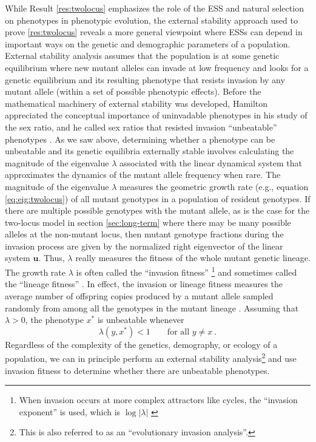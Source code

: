 \documentclass[11pt]{article}
\newcommand{\ess}[1]{#1^*}
\renewcommand{\vec}[1]{\symbf{#1}}
\newcommand{\eig}{\lambda}
\begin{document}
While Result \ref{res:twolocus} emphasizes the role of the ESS and natural selection on phenotypes in phenotypic evolution, the external stability approach used to prove \ref{res:twolocus} reveals a more general viewpoint where ESSs can depend in important ways on the genetic and demographic parameters of a population. External stability analysis assumes that the population is at some genetic equilibrium where new mutant alleles can invade at low frequency and looks for a genetic equilibrium and its resulting phenotype that resists invasion by any mutant allele (within a set of possible phenotypic effects). Before the mathematical machinery of external stability was developed, Hamilton appreciated the conceptual importance of uninvadable phenotypes in his study of the sex ratio, and he called sex ratios that resisted invasion ``unbeatable'' phenotypes \cite{Hamilton:1967}. As we saw above, determining whether a phenotype can be unbeatable and its genetic equilibria externally stable involves calculating the magnitude of the eigenvalue $\eig$ associated with the linear dynamical system that approximates the dynamics of the mutant allele frequency when rare. The magnitude of the eigenvalue $\eig$ measures the geometric growth rate (e.g., equation \eqref{eq:eig:twolocus}) of all mutant genotypes in a population of resident genotypes. If there are multiple possible genotypes with the mutant allele, as is the case for the two-locus model in section \ref{sec:long-term} where there may be many possible alleles at the non-mutant locus, then mutant genotype fractions during the invasion process are given by the normalized right eigenvector of the linear system $\vec{u}$. Thus, $\eig$ really measures the fitness of the whole mutant genetic lineage. The growth rate $\eig$ is often called the ``invasion fitness'' \cite{Metz:Nisbet:1992,Heino:Metz:1998}\footnote{When invasion occurs at more complex attractors like cycles, the ``invasion exponent'' is used, which is $\log |\eig|$ \cite{Rand:Wilson:1994}} and sometimes called the ``lineage fitness'' \cite{Lehmann:Alger:2015,Akcay:VanCleve:2016,Lehmann:Mullon:2016,Lehmann:Rousset:2020}. In effect, the invasion or lineage fitness measures the average number of offspring copies produced by a mutant allele sampled randomly from among all the genotypes in the mutant lineage \cite{Lehmann:Mullon:2016}. Assuming that $\eig >0$, the phenotype $\ess{x}$ is unbeatable whenever
\begin{equation}
  \label{eq:unbeatable}
  \eig(y, \ess{x}) < 1 \qquad \text{for all } y \ne x \: .
\end{equation}
Regardless of the complexity of the genetics, demography, or ecology of a population, we can in principle perform an external stability analysis\footnote{This is also referred to as an ``evolutionary invasion analysis''.} and use invasion fitness to determine whether there are unbeatable phenotypes.
\end{document}
